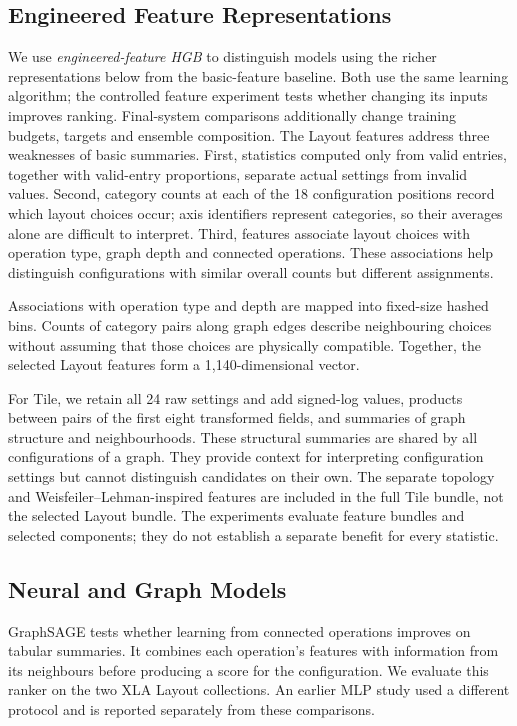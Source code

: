 \documentclass[letterpaper]{article}
\begin{document}
\subsection{Engineered Feature Representations}
\label{sec:features}
We use \emph{engineered-feature HGB} to distinguish models using the richer representations below from the basic-feature baseline. Both use the same learning algorithm; the controlled feature experiment tests whether changing its inputs improves ranking. Final-system comparisons additionally change training budgets, targets and ensemble composition.
The Layout features address three weaknesses of basic summaries. First, statistics computed only from valid entries, together with valid-entry proportions, separate actual settings from invalid values. Second, category counts at each of the 18 configuration positions record which layout choices occur; axis identifiers represent categories, so their averages alone are difficult to interpret. Third, features associate layout choices with operation type, graph depth and connected operations. These associations help distinguish configurations with similar overall counts but different assignments.

Associations with operation type and depth are mapped into fixed-size hashed bins. Counts of category pairs along graph edges describe neighbouring choices without assuming that those choices are physically compatible. Together, the selected Layout features form a 1,140-dimensional vector.

For Tile, we retain all 24 raw settings and add signed-log values, products between pairs of the first eight transformed fields, and summaries of graph structure and neighbourhoods. These structural summaries are shared by all configurations of a graph. They provide context for interpreting configuration settings but cannot distinguish candidates on their own. The separate topology and Weisfeiler--Lehman-inspired features are included in the full Tile bundle, not the selected Layout bundle. The experiments evaluate feature bundles and selected components; they do not establish a separate benefit for every statistic.

\subsection{Neural and Graph Models}
\label{sec:gnn}
GraphSAGE tests whether learning from connected operations improves on tabular summaries. It combines each operation's features with information from its neighbours before producing a score for the configuration. We evaluate this ranker on the two XLA Layout collections. An earlier MLP study used a different protocol and is reported separately from these comparisons.
\end{document}
